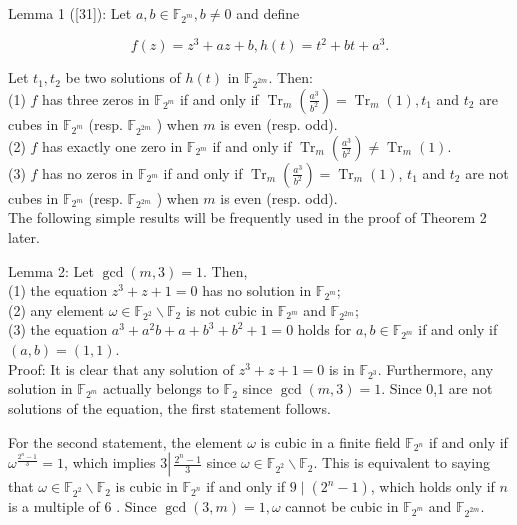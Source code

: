 \documentclass[10pt]{article}
\begin{document}
Lemma 1 ([31]): Let $a, b \in \mathbb{F}_{2^{m}}, b \neq 0$ and define

$$
f(z)=z^{3}+a z+b, h(t)=t^{2}+b t+a^{3} .
$$

Let $t_{1}, t_{2}$ be two solutions of $h(t)$ in $\mathbb{F}_{2^{2 m}}$. Then:\\
(1) $f$ has three zeros in $\mathbb{F}_{2^{m}}$ if and only if $\operatorname{Tr}_{m}\left(\frac{a^{3}}{b^{2}}\right)= \operatorname{Tr}_{m}(1), t_{1}$ and $t_{2}$ are cubes in $\mathbb{F}_{2^{m}}$ (resp. $\mathbb{F}_{2^{2 m}}$ ) when $m$ is even (resp. odd).\\
(2) $f$ has exactly one zero in $\mathbb{F}_{2^{m}}$ if and only if $\operatorname{Tr}_{m}\left(\frac{a^{3}}{b^{2}}\right) \neq \operatorname{Tr}_{m}(1)$.\\
(3) $f$ has no zeros in $\mathbb{F}_{2^{m}}$ if and only if $\operatorname{Tr}_{m}\left(\frac{a^{3}}{b^{2}}\right)=\operatorname{Tr}_{m}(1)$, $t_{1}$ and $t_{2}$ are not cubes in $\mathbb{F}_{2^{m}}$ (resp. $\mathbb{F}_{2^{2 m}}$ ) when $m$ is even (resp. odd).\\
The following simple results will be frequently used in the proof of Theorem 2 later.

Lemma 2: Let $\operatorname{gcd}(m, 3)=1$. Then,\\
(1) the equation $z^{3}+z+1=0$ has no solution in $\mathbb{F}_{2^{m}}$;\\
(2) any element $\omega \in \mathbb{F}_{2^{2}} \backslash \mathbb{F}_{2}$ is not cubic in $\mathbb{F}_{2^{m}}$ and $\mathbb{F}_{2^{2 m}}$;\\
(3) the equation $a^{3}+a^{2} b+a+b^{3}+b^{2}+1=0$ holds for $a, b \in \mathbb{F}_{2^{m}}$ if and only if $(a, b)=(1,1)$.\\
Proof: It is clear that any solution of $z^{3}+z+1=0$ is in $\mathbb{F}_{2^{3}}$. Furthermore, any solution in $\mathbb{F}_{2^{m}}$ actually belongs to $\mathbb{F}_{2}$ since $\operatorname{gcd}(m, 3)=1$. Since 0,1 are not solutions of the equation, the first statement follows.

For the second statement, the element $\omega$ is cubic in a finite field $\mathbb{F}_{2^{n}}$ if and only if $\omega^{\frac{2^{n}-1}{3}}=1$, which implies $3 \left\lvert\, \frac{2^{n}-1}{3}\right.$ since $\omega \in \mathbb{F}_{2^{2}} \backslash \mathbb{F}_{2}$. This is equivalent to saying that $\omega \in \mathbb{F}_{2^{2}} \backslash \mathbb{F}_{2}$ is cubic in $\mathbb{F}_{2^{n}}$ if and only if $9 \mid\left(2^{n}-1\right)$, which holds only if $n$ is a multiple of 6 . Since $\operatorname{gcd}(3, m)=1, \omega$ cannot be cubic in $\mathbb{F}_{2^{m}}$ and $\mathbb{F}_{2^{2 m}}$.
\end{document}
